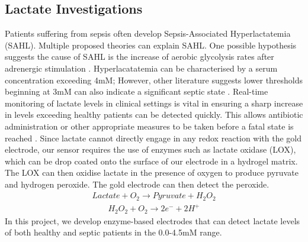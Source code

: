 \subsection{Lactate Investigations}
Patients suffering from sepsis often develop Sepsis-Associated Hyperlactatemia (SAHL). Multiple proposed theories can explain SAHL. One possible hypothesis suggests the cause of SAHL is the increase of aerobic glycolysis rates after adrenergic stimulation \cite{garcia2014sepsis}.
Hyperlacatatemia can be characterised by a serum concentration exceeding 4mM; However,  other literature suggests lower thresholds beginning at 3mM can also indicate a significant septic state \cite{singer2014ed}.
Real-time monitoring of lactate levels in clinical settings is vital in ensuring a sharp increase in levels exceeding healthy patients can be detected quickly. This allows antibiotic administration or other appropriate measures to be taken before a fatal state is reached \cite{gyawali2019sepsis}.
Since lactate cannot directly engage in any redox reaction with the gold electrode, our sensor requires the use of enzymes such as lactate oxidase (LOX), which can be drop coated onto the surface of our electrode in a hydrogel matrix. The LOX can then oxidise lactate in the presence of oxygen to produce pyruvate and hydrogen peroxide. The gold electrode can then detect the peroxide.
\begin{align}
    Lactate + O_{2}  \xrightarrow{} Pyruvate + H_{2}O_{2}
\end{align}
\begin{align}
    H_{2}O_{2} + O_{2}  \xrightarrow{} 2e^{-}+2H^{+}
\end{align}
In this project, we develop enzyme-based electrodes that can detect lactate levels of both healthy and septic patients in the 0.0-4.5mM range.
